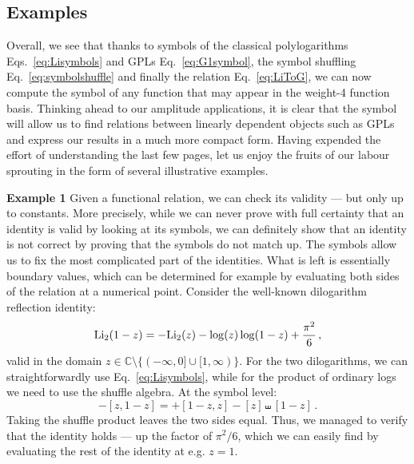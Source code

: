\documentclass[main.tex]{subfiles}
\begin{document}
\subsection{Examples}
Overall, we see that thanks to symbols of the classical polylogarithms Eqs.~\ref{eq:Lisymbols} and GPLs Eq.~\ref{eq:G1symbol}, the symbol shuffling Eq.~\ref{eq:symbolshuffle} and finally the relation Eq.~\ref{eq:LiToG}, we can now compute the symbol of any function that may appear in the weight-4 function basis. Thinking ahead to our amplitude applications, it is clear that the symbol will allow us to find relations between linearly dependent objects such as GPLs and express our results in a much more compact form. Having expended the effort of understanding the last few pages, let us enjoy the fruits of our labour sprouting in the form of several illustrative examples.

\textbf{Example 1} \newline
Given a functional relation, we can check its validity --- but only up to constants. More precisely, while we can never prove with full certainty that an identity is valid by looking at its symbols, we can definitely show that an identity is not correct by proving that the symbols do not match up. The symbols allow us to fix the most complicated part of the identities. What is left is essentially boundary values, which can be determined for example by evaluating both sides of the relation at a numerical point. Consider the well-known dilogarithm reflection identity:
\begin{equation}
    \text{Li}_2(1-z) =- \text{Li}_2(z) -\log(z) \log(1-z) + \frac{\pi^2}{6} \,,
\end{equation}
valid in the domain $z \in \mathbb{C} \setminus\{(-\infty, 0] \cup [1, \infty)\}$. For the two dilogarithms, we can straightforwardly use Eq.~\ref{eq:Lisymbols}, while for the product of ordinary logs we need to use the shuffle algebra. At the symbol level:
\begin{equation}
    -[z,1-z] = + [1-z,z] - [z] \shuffle [1-z]\,.
\end{equation}
Taking the shuffle product leaves the two sides equal. Thus, we managed to verify that the identity holds --- up the factor of $\pi^2/6$, which we can easily find by evaluating the rest of the identity at e.g. $z=1$.
\end{document}
